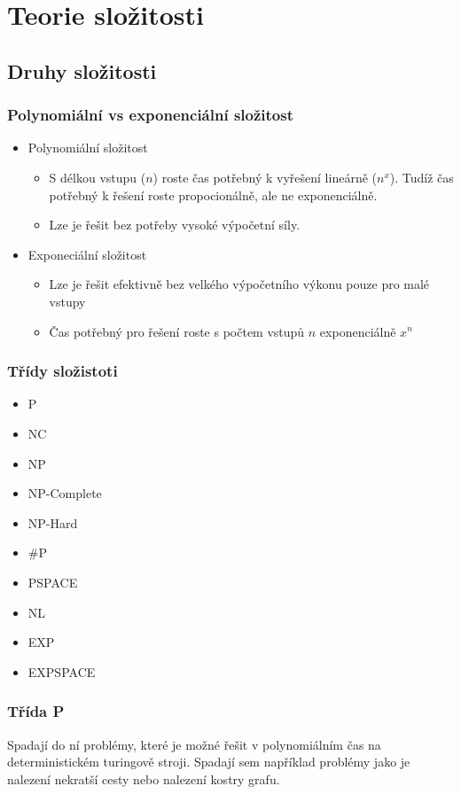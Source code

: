 \section{Teorie složitosti}
\subsection{Druhy složitosti}
\subsubsection{Polynomiální vs exponenciální složitost}
\begin{itemize}
    \item Polynomiální složitost
    \begin{itemize}
        \item S délkou vstupu (\(n\)) roste čas potřebný k vyřešení lineárně (\(n^x\)). Tudíž čas potřebný k řešení roste propocionálně, ale ne exponenciálně.
        \item Lze je řešit bez potřeby vysoké výpočetní síly.
    \end{itemize}
    \item Exponeciální složitost
    \begin{itemize}
        \item Lze je řešit efektivně bez velkého výpočetního výkonu pouze pro malé vstupy
        \item Čas potřebný pro řešení roste s počtem vstupů \(n\) exponenciálně \(x^n\)
    \end{itemize}
\end{itemize}

\subsubsection{Třídy složistoti}
\begin{itemize}
    \item P
    \item NC
    \item NP
    \item NP-Complete 
    \item NP-Hard
    \item \#P
    \item PSPACE
    \item NL
    \item EXP
    \item EXPSPACE
\end{itemize}

\subsubsection{Třída P}
Spadají do ní problémy, které je možné řešit v polynomiálním čas na deterministickém turingově stroji. Spadají sem například problémy jako je nalezení nekratší
cesty nebo nalezení kostry grafu.
